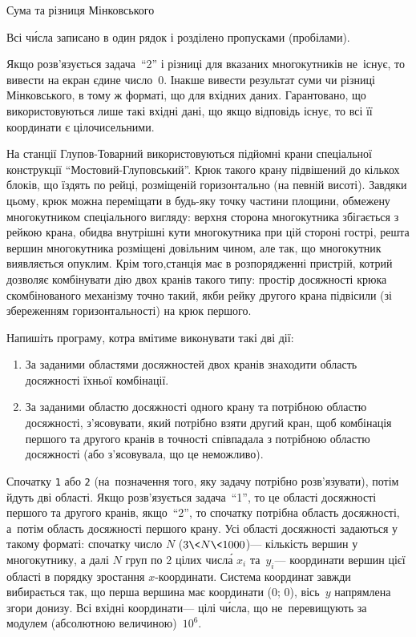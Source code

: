 \begin{problemAllDefault}{Сума та різниця Мінковського}
\begin{small}
Всі ч\'{и}сла записано в один рядок і розділено пропусками (пробілами).

\OutputFile
Якщо розв'язується задача~``2'' і різниці для вказаних многокутників не~існує, то вивести на екран єдине число~0. Інакше вивести результат суми чи різниці Мінковського, в тому ж форматі, що для вхідних даних.
Гарантовано, що використовуються лише такі вхідні дані, що якщо відповідь існує, то всі її координати є цілочисельними.


\noindent\hrulefill

На станції Глупов-Товарний використовуються підйомні крани спеціальної конструкції ``Мостовий-Глуповський''. Крюк такого крану підвішений до кількох блоків, що їздять по рейці, розміщеній горизонтально (на певній висоті). Завдяки цьому, крюк можна переміщати в будь-яку точку частини площини, обмежену многокутником спеціального вигляду: верхня сторона многокутника збігається з рейкою крана, обидва внутрішні кути многокутника при цій стороні гострі, решта вершин многокутника розміщені довільним чином, але так, що многокутник виявляється опуклим. Крім того,станція має в розпорядженні пристрій, котрий дозволяє комбінувати дію двох кранів такого типу: простір досяжності крюка скомбінованого механізму точно такий, якби рейку другого крана підвісили (зі збереженням горизонтальності) на крюк першого.

Напишіть програму, котра вмітиме виконувати такі дві дії:
\begin{enumerate}
\item
За заданими областями досяжностей двох кранів знаходити область досяжності їхньої комбінації.
\item
За заданими областю досяжності одного крану та потрібною областю досяжності, з'ясовувати, який потрібно взяти другий кран, щоб комбінація першого та другого кранів в точності співпадала з потрібною областю досяжності (або з'ясовувала, що це неможливо).
\end{enumerate}

\InputFile
Спочатку \texttt{1} або \texttt{2} (на~позначення того, яку задачу потрібно розв'язувати), потім йдуть дві області. Якщо розв'язується задача~``1'', то це області досяжності першого та другого кранів, якщо~``2'', то спочатку потрібна область досяжності, а~потім область досяжності першого крану. Усі області досяжності задаються у такому форматі: спочатку число $N$ (${3{\<}N{\<}1000}$)\nolinebreak[3] --- кількість вершин у многокутнику, а далі $N$ груп по 2 цілих числ\'{а} $x_i$ та~$y_i$\nolinebreak[3] --- координати вершин цієї області в порядку зростання $x$-координати. Система координат завжди вибирається так, що перша вершина має координати (0; 0), вісь~$y$ напрямлена згори донизу. Всі вхідні координати\nolinebreak[3] --- цілі ч\'{и}сла, що не~перевищують за модулем (абсолютною величиною)~$10^6$. 


\end{small}
\end{problemAllDefault}
